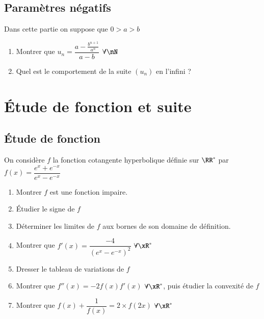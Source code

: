 \documentclass[oneside,12pt]{article}
\let\oldsection\section
\renewcommand{\section}{\newpage\oldsection}
\begin{document}
\subsection{Paramètres négatifs}
Dans cette partie on suppose que $0>a>b$
\begin{enumerate}
    \item Montrer que $u_n=\dfrac{a-\frac{b^{n+1}}{a^n}}{a-b}$ \quad $\forall\nN$
    \item Quel est le comportement de la suite $(u_n)$ en l'infini ?
\end{enumerate}





\section{Étude de fonction et suite}
\subsection{Étude de fonction}
On considère $f$ la fonction cotangente hyperbolique définie sur $\RR^*$ par $f(x)=\dfrac{e^x+e^{-x}}{e^x-e^{-x}}$
\begin{enumerate}
    \item Montrer $f$ est une fonction impaire.
    \item Étudier le signe de $f$
    \item Déterminer les limites de $f$ aux bornes de son domaine de définition.
    \item Montrer que $f'(x)=\dfrac{-4}{(e^x-e^{-x})^2}$ \quad $\forall\xR^*$
    \item Dresser le tableau de variations de $f$
    \item Montrer que $f''(x)=-2f(x)f'(x)$ \quad $\forall\xR^*$, \quad puis étudier la convexité de $f$
    \item Montrer que $f(x)+\dfrac{1}{f(x)}=2\times f(2x)$  \quad $\forall\xR^*$
\end{enumerate}
\end{document}
